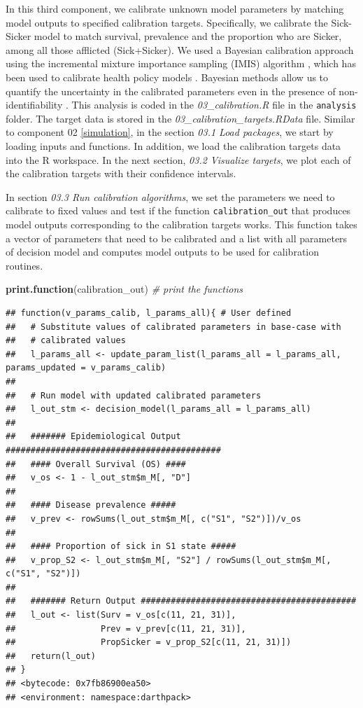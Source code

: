 \documentclass[]{book}
\newenvironment{Shaded}{\begin{snugshade}}{\end{snugshade}}
\newcommand{\KeywordTok}[1]{\textcolor[rgb]{0.13,0.29,0.53}{\textbf{#1}}}
\newcommand{\CommentTok}[1]{\textcolor[rgb]{0.56,0.35,0.01}{\textit{#1}}}
\newcommand{\NormalTok}[1]{#1}
\begin{document}
In this third component, we calibrate unknown model parameters by
matching model outputs to specified calibration targets. Specifically,
we calibrate the Sick-Sicker model to match survival, prevalence and the
proportion who are Sicker, among all those afflicted (Sick+Sicker). We
used a Bayesian calibration approach using the incremental mixture
importance sampling (IMIS) algorithm \citep{Steele2006}, which has been
used to calibrate health policy models \citep[\citet{Menzies2017},
\citet{Rutter2018}]{Raftery2010}. Bayesian methods allow us to quantify
the uncertainty in the calibrated parameters even in the presence of
non-identifiability \citep{Alarid-Escudero2018b}. This analysis is coded
in the \emph{03\_calibration.R} file in the \texttt{analysis} folder.
The target data is stored in the \emph{03\_calibration\_targets.RData}
file. Similar to component 02 \ref{simulation}, in the section
\emph{03.1 Load packages}, we start by loading inputs and functions. In
addition, we load the calibration targets data into the R workspace. In
the next section, \emph{03.2 Visualize targets}, we plot each of the
calibration targets with their confidence intervals.

In section \emph{03.3 Run calibration algorithms}, we set the parameters
we need to calibrate to fixed values and test if the function
\texttt{calibration\_out} that produces model outputs corresponding to
the calibration targets works. This function takes a vector of
parameters that need to be calibrated and a list with all parameters of
decision model and computes model outputs to be used for calibration
routines.

\begin{Shaded}
\begin{Highlighting}[]
\KeywordTok{print.function}\NormalTok{(calibration_out) }\CommentTok{# print the functions}
\end{Highlighting}
\end{Shaded}

\begin{verbatim}
## function(v_params_calib, l_params_all){ # User defined
##   # Substitute values of calibrated parameters in base-case with 
##   # calibrated values
##   l_params_all <- update_param_list(l_params_all = l_params_all, params_updated = v_params_calib)
##   
##   # Run model with updated calibrated parameters
##   l_out_stm <- decision_model(l_params_all = l_params_all)
##   
##   ####### Epidemiological Output ###########################################
##   #### Overall Survival (OS) ####
##   v_os <- 1 - l_out_stm$m_M[, "D"]
##   
##   #### Disease prevalence #####
##   v_prev <- rowSums(l_out_stm$m_M[, c("S1", "S2")])/v_os
##   
##   #### Proportion of sick in S1 state #####
##   v_prop_S2 <- l_out_stm$m_M[, "S2"] / rowSums(l_out_stm$m_M[, c("S1", "S2")])
##   
##   ####### Return Output ###########################################
##   l_out <- list(Surv = v_os[c(11, 21, 31)],
##                 Prev = v_prev[c(11, 21, 31)],
##                 PropSicker = v_prop_S2[c(11, 21, 31)])
##   return(l_out)
## }
## <bytecode: 0x7fb86900ea50>
## <environment: namespace:darthpack>
\end{verbatim}
\end{document}
